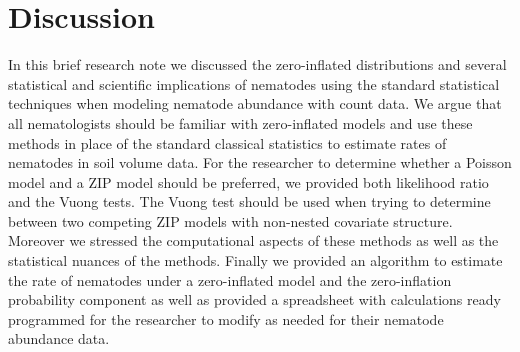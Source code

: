 \documentclass{article}
\begin{document}
\section{Discussion}
In this brief research note we discussed the zero-inflated distributions and several statistical and scientific implications of nematodes using the standard statistical techniques when modeling nematode abundance with count data. We argue that all nematologists should be familiar with zero-inflated models and use these methods in place of the standard classical statistics to estimate rates of nematodes in soil volume data. For the researcher to determine whether a Poisson model and a ZIP model should be preferred, we  provided both likelihood ratio and the Vuong tests. The Vuong test should be used when trying to determine between two competing ZIP models with non-nested covariate structure. Moreover we stressed the computational aspects of these methods as well as the statistical nuances of the methods. Finally we provided an algorithm to estimate the rate of nematodes under a zero-inflated model and the zero-inflation probability component as well as provided a spreadsheet with calculations ready programmed for the researcher to modify as needed for their nematode abundance data. 


 
\end{document}
